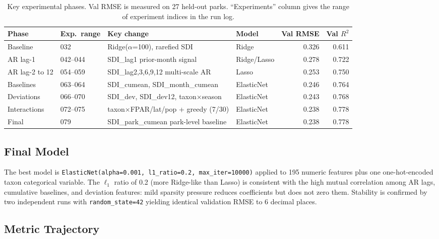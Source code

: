 \documentclass{article}
\begin{document}
\begin{table}[t]
  \caption{Key experimental phases. Val RMSE is measured on 27
    held-out parks. ``Experiments'' column gives the range of
    experiment indices in the run log.}
  \label{tab:phases}
  \centering
  \small
  \begin{tabular}{llllrr}
    \toprule
    Phase & Exp.\ range & Key change & Model & Val RMSE & Val $R^{2}$ \\
    \midrule
    Baseline       & 032      & Ridge($\alpha$=100), rarefied SDI           & Ridge       & 0.326 & 0.611 \\
    AR lag-1       & 042--044 & SDI\_lag1 prior-month signal                & Ridge/Lasso & 0.278 & 0.722 \\
    AR lag-2 to 12 & 054--059 & SDI\_lag2,3,6,9,12 multi-scale AR           & Lasso       & 0.253 & 0.750 \\
    Baselines      & 063--064 & SDI\_cumean, SDI\_month\_cumean             & ElasticNet  & 0.246 & 0.764 \\
    Deviations     & 066--070 & SDI\_dev, SDI\_dev12, taxon$\times$season   & ElasticNet  & 0.243 & 0.768 \\
    Interactions   & 072--075 & taxon$\times$FPAR/lat/pop + greedy (7/30)   & ElasticNet  & 0.238 & 0.778 \\
    Final          & 079      & SDI\_park\_cumean park-level baseline        & ElasticNet  & 0.238 & 0.778 \\
    \bottomrule
  \end{tabular}
\end{table}

\subsection{Final Model}

The best model is \texttt{ElasticNet(alpha=0.001, l1\_ratio=0.2,
max\_iter=10000)} applied to 195 numeric features plus one
one-hot-encoded taxon categorical variable. The $\ell_1$ ratio of 0.2
(more Ridge-like than Lasso) is consistent with the high mutual
correlation among AR lags, cumulative baselines, and deviation
features: mild sparsity pressure reduces coefficients but does not
zero them. Stability is confirmed by two independent runs with
\texttt{random\_state=42} yielding identical validation RMSE to 6
decimal places.

\subsection{Metric Trajectory}
\end{document}
